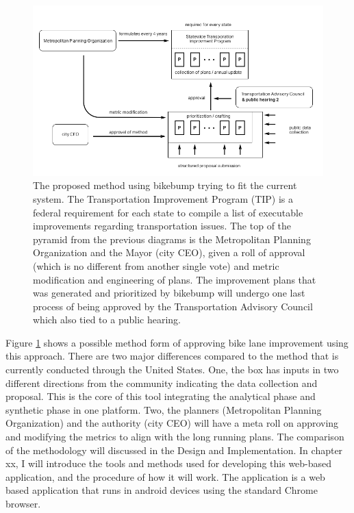 \begin{figure}[!htb]
\includegraphics[width=\textwidth]{chapters/1/fig/proposed_process.png}               
 	 \caption[proposed method]{The proposed method using bikebump trying to fit the current system. The Transportation Improvement Program (TIP) is a federal requirement for each state to compile a list of executable improvements regarding transportation issues. The top of the pyramid from the previous diagrams is the Metropolitan Planning Organization and the Mayor (city CEO), given a roll of approval (which is no different from another single vote) and metric modification and engineering of plans. The improvement plans that was generated and prioritized by bikebump will undergo one last process of being approved by the Transportation Advisory Council which also tied to a public hearing.}
  	\label{fig:proposed}
\end{figure}

Figure \ref{fig:proposed} shows a possible method form of approving bike lane improvement using this approach. There are two major differences compared to the method that is currently conducted through the United States. One, the box has inputs in two different directions from the community indicating the data collection and proposal. This is the core of this tool integrating the analytical phase and synthetic phase in one platform. Two, the planners (Metropolitan Planning Organization) and the authority (city CEO) will have a meta roll on approving and modifying the metrics to align with the long running plans. The comparison of the methodology will discussed in the Design and Implementation.
In chapter xx, I will introduce the tools and methods used for developing this web-based application, and the procedure of how it will work. The application is a web based application that runs in android devices using the standard Chrome browser.

